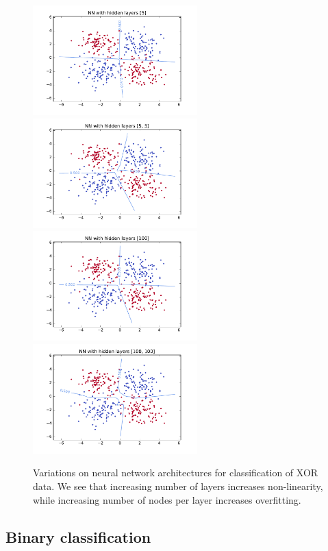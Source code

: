 \documentclass{article}
\begin{document}
\begin{multicols}{2}
\begin{figure}[h]
   \centering
   \includegraphics[width=2.5in]{img/p1/4-1small-382of400-16500.pdf}
   \includegraphics[width=2.5in]{img/p1/4-2small-380of400-3550.pdf}
   \includegraphics[width=2.5in]{img/p1/4-1large-380of400.pdf}
   \includegraphics[width=2.5in]{img/p1/4-2large-379of400-123000.pdf}
   \caption{Variations on neural network architectures for classification of
   XOR data. We see that increasing number of layers increases non-linearity,
   while increasing number of nodes per layer increases overfitting. 
   }
   \label{fig:1-2-arch}
\end{figure}

\subsection{Binary classification}
\label{subsubsec:binary}


\end{multicols}
\end{document}
